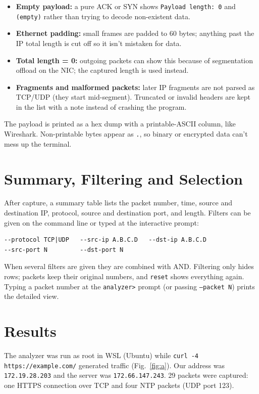 \documentclass[11pt,a4paper]{article}
\begin{document}
\begin{itemize}
  \item \textbf{Empty payload:} a pure ACK or SYN shows \texttt{Payload length:
  0} and \texttt{(empty)} rather than trying to decode non-existent data.
  \item \textbf{Ethernet padding:} small frames are padded to 60 bytes; anything
  past the IP total length is cut off so it isn't mistaken for data.
  \item \textbf{Total length = 0:} outgoing packets can show this because of
  segmentation offload on the NIC; the captured length is used instead.
  \item \textbf{Fragments and malformed packets:} later IP fragments are not
  parsed as TCP/UDP (they start mid-segment). Truncated or invalid headers are
  kept in the list with a note instead of crashing the program.
\end{itemize}

The payload is printed as a hex dump with a printable-ASCII column, like
Wireshark. Non-printable bytes appear as \texttt{.}, so binary or encrypted
data can't mess up the terminal.

\section{Summary, Filtering and Selection}

After capture, a summary table lists the packet number, time, source and
destination IP, protocol, source and destination port, and length. Filters can
be given on the command line or typed at the interactive prompt:

\begin{lstlisting}
--protocol TCP|UDP   --src-ip A.B.C.D   --dst-ip A.B.C.D
--src-port N         --dst-port N
\end{lstlisting}

When several filters are given they are combined with AND. Filtering only hides
rows; packets keep their original numbers, and \texttt{reset} shows everything
again. Typing a packet number at the \texttt{analyzer>} prompt (or passing
\texttt{--packet N}) prints the detailed view.

\section{Results}

The analyzer was run as root in WSL (Ubuntu) while \texttt{curl -4
https://example.com/} generated traffic (Fig.~\ref{fig:a}). Our address was
\texttt{172.19.28.203} and the server was \texttt{172.66.147.243}. 29 packets
were captured: one HTTPS connection over TCP and four NTP packets (UDP port
123).
\end{document}
